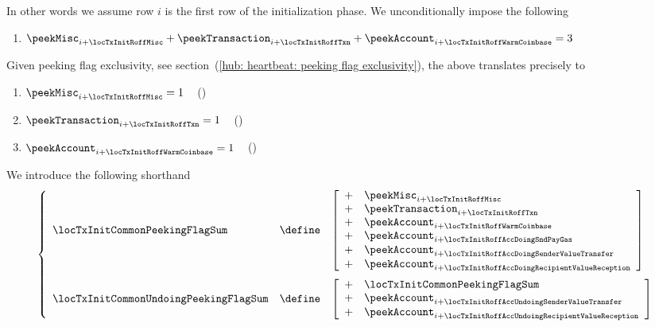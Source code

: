 \begin{center}
\end{center}
In other words we assume row $i$ is the first row of the initialization phase.
We unconditionally impose the following
\begin{enumerate}
	\item 
		\label{hub: initialization phase: the first rows are misc and transaction rows}
		$\peekMisc _{i + \locTxInitRoffMisc} + \peekTransaction _{i + \locTxInitRoffTxn} + \peekAccount _{i + \locTxInitRoffWarmCoinbase} = 3$
\end{enumerate}
Given peeking flag exclusivity,
see section~(\ref{hub: heartbeat: peeking flag exclusivity}),
the above translates precisely to
\begin{enumerate}[resume]
	\item $\peekMisc        _{i + \locTxInitRoffMisc}     = 1$ ~ (\trash)
	\item $\peekTransaction _{i + \locTxInitRoffTxn}      = 1$ ~ (\trash)
	\item $\peekAccount     _{i + \locTxInitRoffWarmCoinbase} = 1$ ~ (\trash)
\end{enumerate}
We introduce the following shorthand
\[
	\left\{ \begin{array}{lcl}
		\locTxInitCommonPeekingFlagSum & \define &
		\left[ \begin{array}{cl} 
			+ & \peekMisc        _{i + \locTxInitRoffMisc                            } \\
			+ & \peekTransaction _{i + \locTxInitRoffTxn                             } \\
			+ & \peekAccount     _{i + \locTxInitRoffWarmCoinbase                    } \\
			+ & \peekAccount     _{i + \locTxInitRoffAccDoingSndPayGas               } \\
			+ & \peekAccount     _{i + \locTxInitRoffAccDoingSenderValueTransfer     } \\
			+ & \peekAccount     _{i + \locTxInitRoffAccDoingRecipientValueReception } \\
		\end{array} \right]
		\vspace{2mm}
		\\
		\locTxInitCommonUndoingPeekingFlagSum & \define &
		\left[ \begin{array}{cl} 
			+ & \locTxInitCommonPeekingFlagSum                                           \\
			+ & \peekAccount     _{i + \locTxInitRoffAccUndoingSenderValueTransfer     } \\
			+ & \peekAccount     _{i + \locTxInitRoffAccUndoingRecipientValueReception } \\
		\end{array} \right]
		\\
	\end{array} \right.
\]
